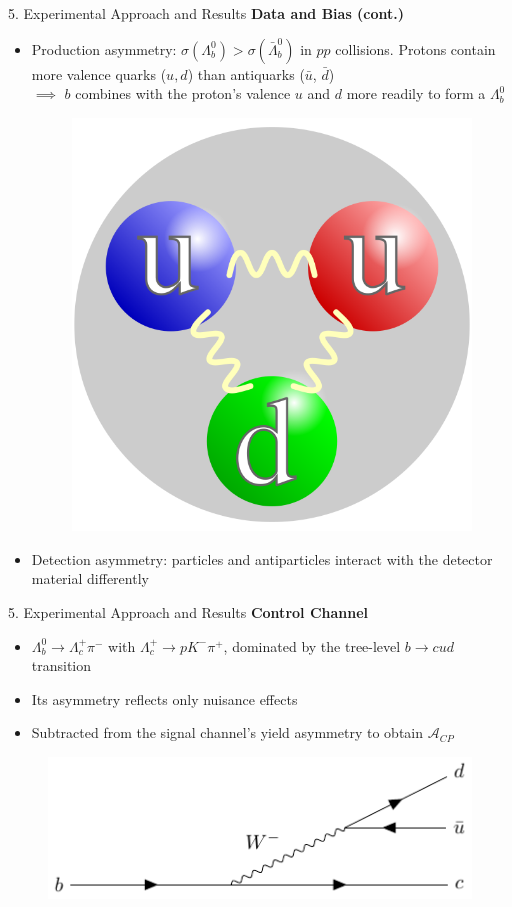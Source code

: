 \documentclass[xcolor=dvipsnames]{beamer}
\def\s{\sigma}
\def\Ld{\Lambda}
\begin{document}
\begin{frame}{5. Experimental Approach and Results}
\textbf{Data and Bias (cont.)}\\
\begin{itemize}
    \item Production asymmetry: $\s(\Ld_{b}^{0})>\s(\bar{\Ld}_{b}^{0})$ in $pp$ collisions. Protons contain more valence quarks ($u, d$) than antiquarks ($\bar{u}$, $\bar{d}$)\\
    $\implies$ $b$ combines with the proton’s valence $u$ and $d$ more readily to form a $\Ld_{b}^{0}$
    \begin{figure}
        \centering
        \includegraphics[width=0.2\linewidth]{Quark_structure_proton.png}
    \end{figure}
    \item Detection asymmetry: particles and antiparticles interact with the detector material differently
\end{itemize}
\end{frame}

\begin{frame}{5. Experimental Approach and Results}
\textbf{Control Channel}\\
\begin{itemize}
    \item $\Ld_{b}^{0}\to \Ld_{c}^{+}\pi^{-}$ with $\Ld_{c}^{+}\to p K^{-}\pi^{+}$, dominated by the tree-level $b\to cud$ transition
    \item Its asymmetry reflects only nuisance effects
    \item Subtracted from the signal channel’s yield asymmetry to obtain $\mathcal{A}_{CP}$
\end{itemize}
\begin{figure}
    \centering
    \includegraphics[width=0.5\linewidth]{control_b.pdf}
\end{figure}
\end{frame}
\end{document}
